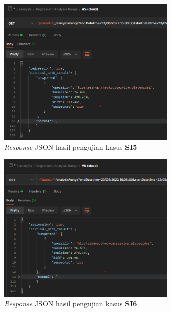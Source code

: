 
\begin{figure}[!htb]
	\centering
	\includegraphics[width=0.75\textwidth]{resources/ch4/json/5.png}
	\caption{\textit{Response} JSON hasil pengujian kasus \textbf{SI5}}
	\label{result_json_5}
\end{figure}


\begin{figure}[!htb]
	\centering
	\includegraphics[width=0.75\textwidth]{resources/ch4/json/6.png}
	\caption{\textit{Response} JSON hasil pengujian kasus \textbf{SI6}}
	\label{result_json_6}
\end{figure}

